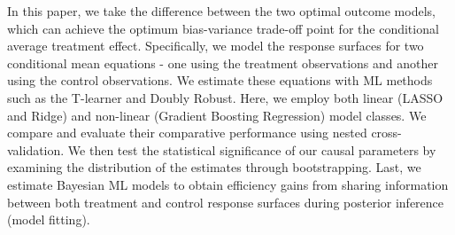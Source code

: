 \documentclass[12pt, a4paper]{article}
\begin{document}
In this paper, we take the difference between the two optimal outcome models, which can achieve the optimum bias-variance trade-off point for the conditional average treatment effect. Specifically, we model the response surfaces for two conditional mean equations - one using the treatment observations and another using the control observations. We estimate these equations with ML methods such as the T-learner and Doubly Robust. Here, we employ both linear (LASSO and Ridge) and non-linear (Gradient Boosting Regression) model classes. We compare and evaluate their comparative performance using nested cross-validation. We then test the statistical significance of our causal parameters by examining the distribution of the estimates through bootstrapping. Last, we estimate Bayesian ML models to obtain efficiency gains from sharing information between both treatment and control response surfaces during posterior inference (model fitting).
\end{document}
